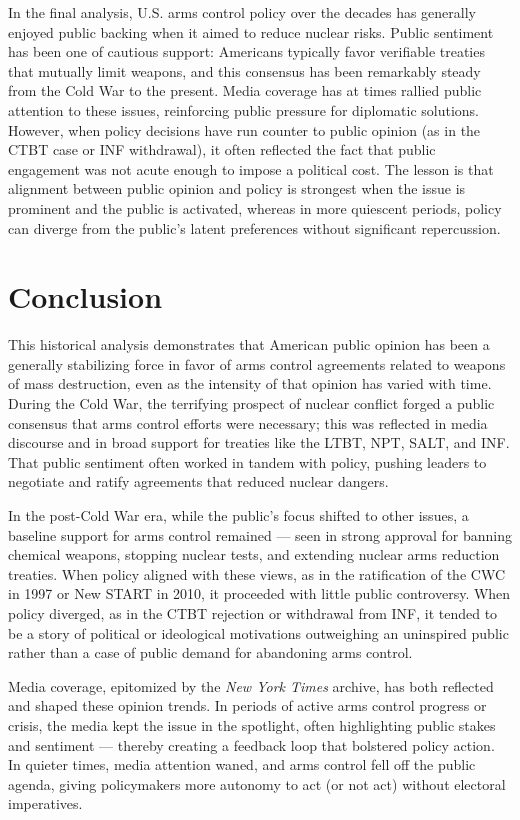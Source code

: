 \documentclass[11,5 pt]{article}
\begin{document}
    In the final analysis, U.S. arms control policy over the decades has generally enjoyed public backing when it aimed to reduce nuclear risks. Public sentiment has been one of cautious support: Americans typically favor verifiable treaties that mutually limit weapons, and this consensus has been remarkably steady from the Cold War to the present. Media coverage has at times rallied public attention to these issues, reinforcing public pressure for diplomatic solutions. However, when policy decisions have run counter to public opinion (as in the CTBT case or INF withdrawal), it often reflected the fact that public engagement was not acute enough to impose a political cost. The lesson is that alignment between public opinion and policy is strongest when the issue is prominent and the public is activated, whereas in more quiescent periods, policy can diverge from the public’s latent preferences without significant repercussion.


\section{Conclusion}

    This historical analysis demonstrates that American public opinion has been a generally stabilizing force in favor of arms control agreements related to weapons of mass destruction, even as the intensity of that opinion has varied with time. During the Cold War, the terrifying prospect of nuclear conflict forged a public consensus that arms control efforts were necessary; this was reflected in media discourse and in broad support for treaties like the LTBT, NPT, SALT, and INF. That public sentiment often worked in tandem with policy, pushing leaders to negotiate and ratify agreements that reduced nuclear dangers. 
    
    In the post-Cold War era, while the public’s focus shifted to other issues, a baseline support for arms control remained — seen in strong approval for banning chemical weapons, stopping nuclear tests, and extending nuclear arms reduction treaties. When policy aligned with these views, as in the ratification of the CWC in 1997 or New START in 2010, it proceeded with little public controversy. When policy diverged, as in the CTBT rejection or withdrawal from INF, it tended to be a story of political or ideological motivations outweighing an uninspired public rather than a case of public demand for abandoning arms control. 
    
    Media coverage, epitomized by the \textit{New York Times} archive, has both reflected and shaped these opinion trends. In periods of active arms control progress or crisis, the media kept the issue in the spotlight, often highlighting public stakes and sentiment — thereby creating a feedback loop that bolstered policy action. In quieter times, media attention waned, and arms control fell off the public agenda, giving policymakers more autonomy to act (or not act) without electoral imperatives. 
    
\end{document}
